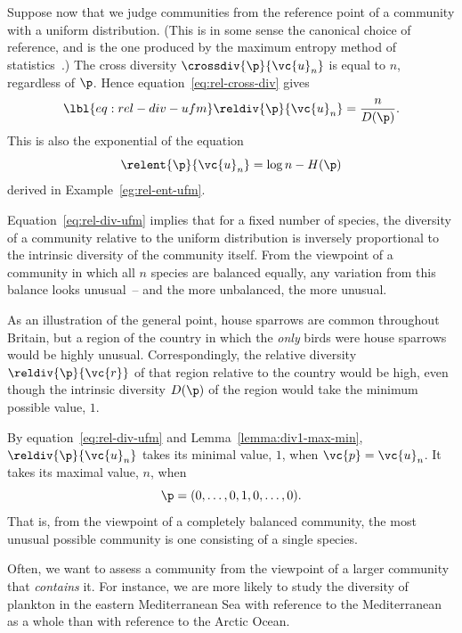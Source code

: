 \begin{example}
% 
Suppose now that we judge communities from the
reference point of a community with a uniform distribution.  (This is in
some sense the canonical choice of reference, and is the one produced by
the maximum entropy method of statistics~\cite{JaynWDWS,BuMa}.)  The
cross diversity $\crossdiv{\p}{\vc{u}_n}$ is equal to $n$, regardless of
$\p$.  Hence equation~\eqref{eq:rel-cross-div} gives
% 
\begin{equation}
\lbl{eq:rel-div-ufm}
\reldiv{\p}{\vc{u}_n}
=
\frac{n}{D(\p)}.
\end{equation}
% 
This is also the exponential of the equation
\[
\relent{\p}{\vc{u}_n} = \log n - H(\p)
\]
derived in Example~\ref{eg:rel-ent-ufm}.

Equation~\eqref{eq:rel-div-ufm} implies that for a fixed number of species,
the diversity of a community relative to the uniform distribution is
inversely proportional to the intrinsic diversity of the community itself.
From the viewpoint of a community in which all $n$ species are balanced
equally, any variation from this balance looks unusual~-- and the more
unbalanced, the more unusual.  

As an illustration of the general point, house sparrows are
common throughout Britain, but a region of the country in which the
\emph{only} birds were house sparrows would be highly unusual.
Correspondingly, the relative diversity $\reldiv{\p}{\vc{r}}$ of that
region relative to the country would be high, even though the intrinsic
diversity $D(\p)$ of the region would take the minimum possible value, $1$.

By equation~\eqref{eq:rel-div-ufm} and Lemma~\ref{lemma:div1-max-min},
$\reldiv{\p}{\vc{u}_n}$ takes its minimal value, $1$, when $\vc{p} =
\vc{u}_n$.  It takes its maximal value, $n$, when
\[
\p = (0, \ldots, 0, 1, 0, \ldots, 0).
\]
That is, from the viewpoint of a completely balanced community, the most
unusual possible community is one consisting of a single species.
\end{example}

Often, we want to assess a community from the viewpoint of a larger
community that \emph{contains} it.  For instance, we are more likely to
study the diversity of plankton in the eastern Mediterranean Sea with reference
to the Mediterranean as a whole than with reference to the Arctic Ocean.

